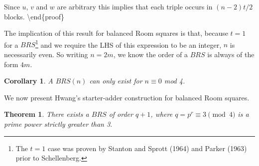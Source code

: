 \documentclass[
  11pt,
  a4paper]{book}
\newtheorem{theorem}{Theorem}
\newtheorem{corollary}{Corollary}[theorem]
\begin{document}
Since \(u\), \(v\) and \(w\) are arbitrary this implies that each
triple occurs in \((n - 2)t/2\) blocks.
\textbackslash end\{proof\}

The implication of this result for balanced Room squares is
that, because \(t=1\) for a \(BRS\)\footnote{The \(t=1\) case was proven by Stanton and Sprott (1964) and Parker
  (1963) prior to Schellenberg.} and we require the LHS
of this expression to be an integer, \(n\) is necessarily
even. So writing \(n=2m\), we know the order of a \(BRS\) is
always of the form \(4m\).

\begin{corollary}
A $BRS(n)$ can only exist for $n \equiv 0$ mod 4.
\end{corollary}

We now present Hwang's starter-adder construction for
balanced Room squares.

\begin{theorem}
There exists a $BRS$ of order $q+1$, where
$q = p^r \equiv 3\pmod 4$ is a prime power strictly greater
than 3.
\end{theorem}
\end{document}
